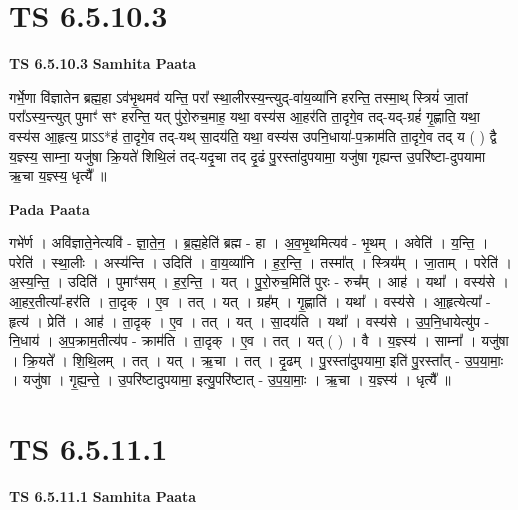 \documentclass[17pt]{extarticle}
\begin{document}

\section{ TS 6.5.10.3 }

\textbf{TS 6.5.10.3 } \newline
\textbf{Samhita Paata} \newline

गर्भे॒णा वि॑ज्ञातेन ब्रह्म॒हा ऽव॑भृ॒थमव॑ यन्ति॒ परा᳚ स्था॒लीरस्य॒न्त्युद्-वा॑य॒व्या॑नि हरन्ति॒ तस्मा॒थ् स्त्रियं॑ जा॒तां परा᳚ऽस्य॒न्त्युत् पुमाꣳ॑ सꣳ हरन्ति॒ यत् पु॑रो॒रुच॒माह॒ यथा॒ वस्य॑स आ॒हर॑ति ता॒दृगे॒व तद्-यद्-ग्रहं॑ गृ॒ह्णाति॒ यथा॒ वस्य॑स आ॒हृत्य॒ प्राऽऽ*ह॑ ता॒दृगे॒व तद्-यथ् सा॒दय॑ति॒ यथा॒ वस्य॑स उपनि॒धाया॑-प॒क्राम॑ति ता॒दृगे॒व तद् य ( ) द्वै य॒ज्ञ्स्य॒ साम्ना॒ यजु॑षा क्रि॒यते॑ शिथि॒लं तद्-यदृ॒चा तद् दृ॒ढं पु॒रस्ता॑दुपयामा॒ यजु॑षा गृह्यन्त उ॒परि॑ष्टा-दुपयामा ऋ॒चा य॒ज्ञ्स्य॒ धृत्यै᳚ ॥ \newline

\textbf{Pada Paata} \newline

गभे॑र्ण । अवि॑ज्ञाते॒नेत्यवि॑ - ज्ञा॒ते॒न॒ । ब्र॒ह्म॒हेति॑ ब्रह्म - हा । अ॒व॒भृ॒थमित्यव॑ - भृ॒थम् । अवेति॑ । य॒न्ति॒ । परेति॑ । स्था॒लीः । अस्य॑न्ति । उदिति॑ । वा॒य॒व्या॑नि । ह॒र॒न्ति॒ । तस्मा᳚त् । स्त्रिय᳚म् । जा॒ताम् । परेति॑ । अ॒स्य॒न्ति॒ । उदिति॑ । पुमाꣳ॑सम् । ह॒र॒न्ति॒ । यत् । पु॒रो॒रुच॒मिति॑ पुरः - रुच᳚म् । आह॑ । यथा᳚ । वस्य॑से । आ॒हर॒तीत्या᳚-हर॑ति । ता॒दृक् । ए॒व । तत् । यत् । ग्रह᳚म् । गृ॒ह्णाति॑ । यथा᳚ । वस्य॑से । आ॒हृत्येत्या᳚ - हृत्य॑ । प्रेति॑ । आह॑ । ता॒दृक् । ए॒व । तत् । यत् । सा॒दय॑ति । यथा᳚ । वस्य॑से । उ॒प॒नि॒धायेत्यु॑प - नि॒धाय॑ । अ॒प॒क्राम॒तीत्य॑प - क्राम॑ति । ता॒दृक् । ए॒व । तत् । यत् ( ) । वै । य॒ज्ञ्स्य॑ । साम्ना᳚ । यजु॑षा । क्रि॒यते᳚ । शि॒थि॒लम् । तत् । यत् । ऋ॒चा । तत् । दृ॒ढम् । पु॒रस्ता॑दुपयामा॒ इति॑ पु॒रस्ता᳚त् - उ॒प॒या॒माः॒ । यजु॑षा । गृ॒ह्य॒न्ते॒ । उ॒परि॑ष्टादुपयामा॒ इत्यु॒परि॑ष्टात् - उ॒प॒या॒माः॒ । ऋ॒चा । य॒ज्ञ्स्य॑ । धृत्यै᳚ ॥  \newline





\section{ TS 6.5.11.1 }

\textbf{TS 6.5.11.1 } \newline
\textbf{Samhita Paata} \newline
\end{document}

